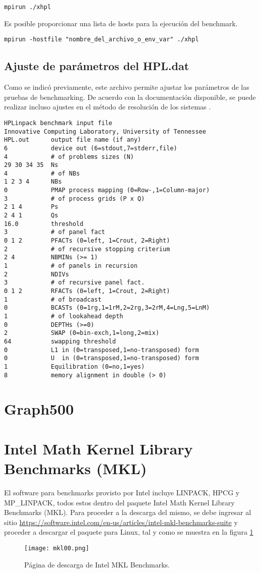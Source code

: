 \begin{lstlisting}
mpirun ./xhpl
\end{lstlisting}

Es posible proporcionar una lista de hosts para la ejecución del benchmark.

\begin{lstlisting}
mpirun -hostfile "nombre_del_archivo_o_env_var" ./xhpl
\end{lstlisting}

\subsection{Ajuste de parámetros del HPL.dat}
Como se indicó previamente, este archivo permite ajustar los parámetros de las pruebas de benchmarking. De acuerdo con la documentación disponible, se puede realizar incluso ajustes en el método de resolución de los sistemas \cite{linpack01}.

\begin{lstlisting}
HPLinpack benchmark input file
Innovative Computing Laboratory, University of Tennessee
HPL.out      output file name (if any)
6            device out (6=stdout,7=stderr,file)
4            # of problems sizes (N)
29 30 34 35  Ns
4            # of NBs
1 2 3 4      NBs
0            PMAP process mapping (0=Row-,1=Column-major)
3            # of process grids (P x Q)
2 1 4        Ps
2 4 1        Qs
16.0         threshold
3            # of panel fact
0 1 2        PFACTs (0=left, 1=Crout, 2=Right)
2            # of recursive stopping criterium
2 4          NBMINs (>= 1)
1            # of panels in recursion
2            NDIVs
3            # of recursive panel fact.
0 1 2        RFACTs (0=left, 1=Crout, 2=Right)
1            # of broadcast
0            BCASTs (0=1rg,1=1rM,2=2rg,3=2rM,4=Lng,5=LnM)
1            # of lookahead depth
0            DEPTHs (>=0)
2            SWAP (0=bin-exch,1=long,2=mix)
64           swapping threshold
0            L1 in (0=transposed,1=no-transposed) form
0            U  in (0=transposed,1=no-transposed) form
1            Equilibration (0=no,1=yes)
8            memory alignment in double (> 0)
\end{lstlisting}

\section{Graph500}



\section{Intel Math Kernel Library Benchmarks (MKL)}
El software para benchmarks provisto por Intel incluye LINPACK, HPCG y MP\_LINPACK, todos estos dentro del paquete Intel Math Kernel Library Benchmarks (MKL). Para proceder a la descarga del mismo, se debe ingresar al sitio \url{https://software.intel.com/en-us/articles/intel-mkl-benchmarks-suite} y proceder a descargar el paquete para Linux, tal y como se muestra en la figura \ref{fig:benchmark:00}

\begin{figure}[H]
\centering
\texttt{[image: mkl00.png]}
\caption{Página de descarga de Intel MKL Benchmarks.}
\label{fig:benchmark:00}
\end{figure}


\clearpage